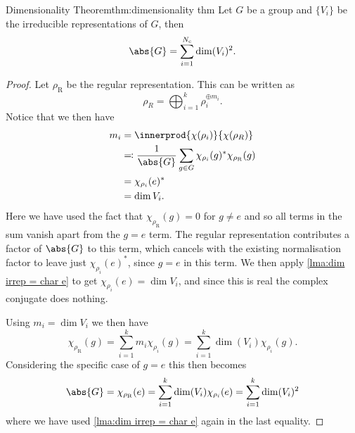 \documentclass[fleqn]{NotesClass}
\newcommand*{\directsum}{\oplus}
\begin{document}
    \begin{thm}{Dimensionality Theorem}{thm:dimensionality thm}
        Let \(G\) be a group and \(\{V_i\}\) be the irreducible representations of \(G\), then
        \begin{equation}
            \abs{G} = \sum_{i = 1}^{N_{\mathrm{c}}} \dim(V_i)^2.
        \end{equation}
        \begin{proof}
            Let \(\rho_{\mathrm{R}}\) be the regular representation.
            This can be written as
            \begin{equation}
                \rho_R = \bigoplus_{i = 1}^{k} \rho_i^{\directsum m_i}.
            \end{equation}
            Notice that we then have
            \begin{align}
                m_i &= \innerprod{\chi(\rho_i)}{\chi(\rho_{R})}\\
                &\eqqcolon \frac{1}{\abs{G}} \sum_{g \in G} \chi_{\rho_i}(g)^* \chi_{\rho_{\mathrm{R}}}(g)\\
                &= \chi_{\rho_i}(e)^*\\
                &= \dim V_i.
            \end{align}
            Here we have used the fact that \(\chi_{\rho_{\mathrm{R}}}(g) = 0\) for \(g \ne e\) and so all terms in the sum vanish apart from the \(g = e\) term.
            The regular representation contributes a factor of \(\abs{G}\) to this term, which cancels with the existing normalisation factor to leave just \(\chi_{\rho_i}(e)^*\), since \(g = e\) in this term.
            We then apply \cref{lma:dim irrep = char e} to get \(\chi_{\rho_i}(e) = \dim V_i\), and since this is real the complex conjugate does nothing.
            
            Using \(m_i = \dim V_i\) we then have
            \begin{equation}
                \chi_{\rho_{\mathrm{R}}}(g) = \sum_{i = 1}^{k} m_i \chi_{\rho_i}(g) = \sum_{i = 1}^{k} \dim(V_i) \chi_{\rho_i}(g).
            \end{equation}
            Considering the specific case of \(g = e\) this then becomes
            \begin{equation}
                \abs{G} = \chi_{\rho_{\mathrm{R}}}(e) = \sum_{i = 1}^{k} \dim(V_i) \chi_{\rho_i}(e) = \sum_{i = 1}^{k} \dim(V_i)^2
            \end{equation}
            where we have used \cref{lma:dim irrep = char e} again in the last equality.
        \end{proof}
    \end{thm}
    
\end{document}
